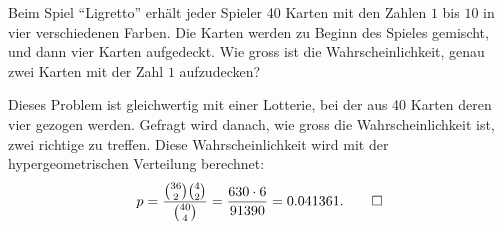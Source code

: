 Beim Spiel ``Ligretto'' erhält jeder Spieler 40 Karten mit den
Zahlen $1$ bis $10$ in vier verschiedenen Farben. Die Karten werden
zu Beginn des Spieles gemischt, und dann vier Karten aufgedeckt.
Wie gross ist die Wahrscheinlichkeit, genau zwei Karten mit der
Zahl $1$ aufzudecken?


\begin{loesung}
Dieses Problem ist gleichwertig mit einer Lotterie, bei der
aus 40 Karten deren vier gezogen werden. Gefragt wird danach,
wie gross die Wahrscheinlichkeit ist, zwei richtige zu treffen.
Diese Wahrscheinlichkeit wird mit der hypergeometrischen Verteilung
berechnet:
\[
p=\frac{\binom{36}{2}\binom{4}{2}}{\binom{40}{4}}
=\frac{630\cdot 6}{91390}=0.041361.
\qedhere
\]
\end{loesung}

